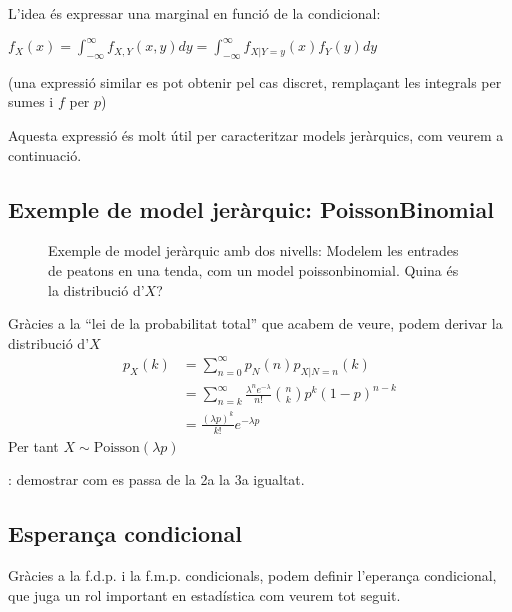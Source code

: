 \documentclass[letterpaper,10pt,english]{sphinxmanual}
\let\sphinxpxdimen\pdfpxdimen\else\newdimen\sphinxpxdimen
\begin{document}
L’idea és expressar una marginal en funció de la condicional:

\(f_{X}(x) = \int^{\infty}_{-\infty} f_{X,Y}(x,y)dy = \int^{\infty}_{-\infty} f_{X|Y=y}(x)f_Y(y)dy\)

(una expressió similar es pot obtenir pel cas discret, remplaçant les integrals per sumes i
\(f\) per \(p\))

Aquesta expressió és molt útil per caracteritzar models jeràrquics, com veurem
a continuació.


\subsection{Exemple de model jeràrquic: Poisson\sphinxhyphen{}Binomial}
\label{\detokenize{0_Intro/0_1_Repas_probabilitat:exemple-de-model-jerarquic-poisson-binomial}}
\begin{figure}[htbp]
\centering
\capstart

\noindent\sphinxincludegraphics[width=700\sphinxpxdimen]{{poisson_binomial}.png}
\caption{Exemple de model jeràrquic amb dos nivells: Modelem les entrades de peatons en una tenda, com un model poisson\sphinxhyphen{}binomial. Quina és la distribució d’\(X\)?}\label{\detokenize{0_Intro/0_1_Repas_probabilitat:id7}}\end{figure}

Gràcies a la “lei de la probabilitat total” que acabem de veure,
podem derivar la distribució d’\(X\)
\begin{equation*}
\begin{split}p_{X}(k) & = \sum_{n=0}^\infty p_N(n) p_{X|N=n}(k) \\
         & = \sum_{n=k}^\infty \frac{\lambda^n e^{-\lambda}}{n!} {n \choose k}p^{k}\left(1 - p\right)^{n-k}\\
         & = \frac{\left(\lambda p\right)^k}{k!}e^{-\lambda p}\end{split}
\end{equation*}
Per tant \(X \sim \mbox{Poisson}\left(\lambda p\right)\)

: demostrar com es passa de la 2a la 3a igualtat.


\subsection{Esperança condicional}
\label{\detokenize{0_Intro/0_1_Repas_probabilitat:esperanca-condicional}}
Gràcies a la f.d.p. i la f.m.p. condicionals, podem definir
l’eperança condicional, que juga un rol important en estadística
com veurem tot seguit.
\end{document}
